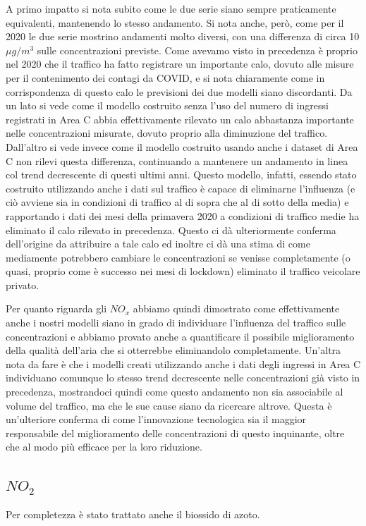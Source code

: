 \documentclass[a4paper]{report}
\begin{document}
A primo impatto si nota subito come le due serie siano sempre praticamente equivalenti, mantenendo lo stesso andamento. Si nota anche, però, come per il 2020 le due serie mostrino andamenti molto diversi, con una differenza di circa 10 $\mu g/m^3$ sulle concentrazioni previste.
Come avevamo visto in precedenza è proprio nel 2020 che il traffico ha fatto registrare un importante calo, dovuto alle misure per il contenimento dei contagi da COVID, e si nota chiaramente come in corrispondenza di questo calo le previsioni dei due modelli siano discordanti.
Da un lato si vede come il modello costruito senza l'uso del numero di ingressi registrati in Area C abbia effettivamente rilevato un calo abbastanza importante nelle concentrazioni misurate, dovuto proprio alla diminuzione del traffico. Dall'altro si vede invece come il modello costruito usando anche i dataset di Area C non rilevi questa differenza, continuando a mantenere un andamento in linea col trend decrescente di questi ultimi anni. Questo modello, infatti, essendo stato costruito utilizzando anche i dati sul traffico è capace di eliminarne l'influenza (e ciò avviene sia in condizioni di traffico al di sopra che al di sotto della media) e rapportando i dati dei mesi della primavera 2020 a condizioni di traffico medie ha eliminato il calo rilevato in precedenza. Questo ci dà ulteriormente conferma dell'origine da attribuire a tale calo ed inoltre ci dà una stima di come mediamente potrebbero cambiare le concentrazioni se venisse completamente (o quasi, proprio come è successo nei mesi di lockdown) eliminato il traffico veicolare privato.

Per quanto riguarda gli $NO_x$ abbiamo quindi dimostrato come effettivamente anche i nostri modelli siano in grado di individuare l'influenza del traffico sulle concentrazioni e abbiamo provato anche a quantificare il possibile miglioramento della qualità dell'aria che si otterrebbe eliminandolo completamente.
Un'altra nota da fare è che i modelli creati utilizzando anche i dati degli ingressi in Area C individuano comunque lo stesso trend decrescente nelle concentrazioni già visto in precedenza, mostrandoci quindi come questo andamento non sia associabile al volume del traffico, ma che le sue cause siano da ricercare altrove. Questa è un'ulteriore conferma di come l'innovazione tecnologica sia il maggior responsabile del miglioramento delle concentrazioni di questo inquinante, oltre che al modo più efficace per la loro riduzione.

\subsection{$NO_2$}
Per completezza è stato trattato anche il biossido di azoto.
\end{document}
